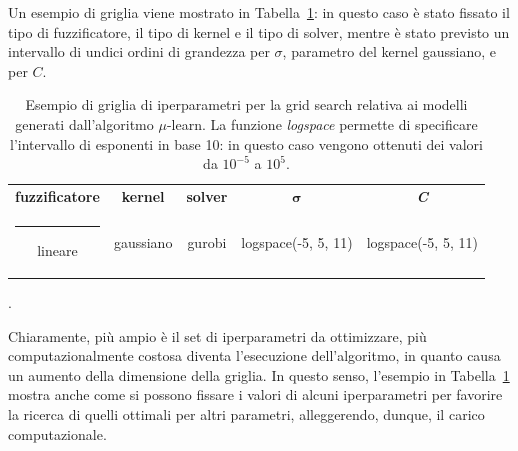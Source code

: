 \documentclass[12pt]{report}
\makeatletter
\theoremstyle{definition}
\newcommand{\thickhline}{%
    \noalign {\ifnum 0=`}\fi \hrule height 1pt
    \futurelet \reserved@a \@xhline
}
\makeatother
\begin{document}
Un esempio di griglia viene mostrato in Tabella~\ref{grid}: in questo caso è stato fissato il tipo di fuzzificatore, il tipo di kernel e il tipo di solver, mentre è stato previsto un intervallo di undici ordini di grandezza per $\sigma$, parametro del kernel gaussiano, e per $C$.
\begin{table}
\centering
 \begin{tabular}{|c|c|c|c|c|} 
 \hline
\textbf{fuzzificatore} & \textbf{kernel} & \textbf{solver} & $\bm{\sigma}$ & \textit{\textbf{C}} 
\\ [0.5ex] 
 \thickhline
 lineare & gaussiano & gurobi & logspace(-5, 5, 11) & logspace(-5, 5, 11) \\ 
 \hline
\end{tabular}
\caption{Esempio di griglia di iperparametri per la grid search relativa ai modelli generati dall'algoritmo $\mu$-learn. La funzione \textit{logspace} permette di specificare l'intervallo di esponenti in base 10: in questo caso vengono ottenuti dei valori da $10^{-5}$ a $10^5$.}.
\label{grid}
\end{table}
Chiaramente, più ampio è il set di iperparametri da ottimizzare, più computazionalmente costosa diventa l'esecuzione dell'algoritmo, in quanto causa un aumento della dimensione della griglia. In questo senso, l'esempio in Tabella~\ref{grid} mostra anche come si possono fissare i valori di alcuni iperparametri per favorire la ricerca di quelli ottimali per altri parametri, alleggerendo, dunque, il carico computazionale. 
\end{document}
